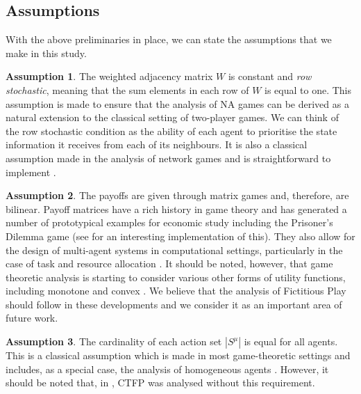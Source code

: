 \documentclass{article}
\theoremstyle{definition}
\newtheorem{assumption}{Assumption}
\newcommand{\weightset}{W}
\newcommand{\actionset}[1]{S^{#1}}
\begin{document}
\subsection{Assumptions}

  With the above preliminaries in place, we can state the assumptions that we make in this study.

  \begin{assumption}\label{ass::rowstochastic}
    The weighted adjacency matrix $\weightset$ is constant and
    \emph{row stochastic}, meaning that the sum elements in each row
    of $\weightset$ is equal to one. This assumption is made to ensure
    that the analysis of NA games can be derived as a natural
    extension to the classical setting of two-player games. We can
    think of the row stochastic condition as the ability of each agent
    to prioritise the state information it receives from each of its
    neighbours. It is also a classical assumption made in the analysis
    of network games \cite{one of the network game papers} and is
    straightforward to implement \cite{Eyad}.
  \end{assumption}

  \begin{assumption}\label{ass::matrixgame}
    The payoffs are given through matrix games and, therefore, are
    bilinear. Payoff matrices have a rich history in game theory and
    has generated a number of prototypical examples for economic study
    including the Prisoner's Dilemma game (see \cite{Axelrod} for an
    interesting implementation of this). They also allow for the
    design of multi-agent systems in computational settings,
    particularly in the case of task and resource allocation \cite{AGT
      and some of the Applied Game Theory Papers}. It should be noted,
    however, that game theoretic analysis is starting to consider
    various other forms of utility functions, including monotone
    \cite{Maryam} and convex \cite{Parise}. We believe that the
    analysis of Fictitious Play should follow in these developments
    and we consider it as an important area of future work.
  \end{assumption}

  \begin{assumption}\label{ass::sameactions}
    The cardinality of each action set $|\actionset{\mu}|$ is equal
    for all agents. This is a classical assumption which is made in
    most game-theoretic settings and includes, as a special case, the
    analysis of homogeneous agents \cite{}. However, it should be
    noted that, in \cite{Ewerhart}, CTFP was analysed without this
    requirement.
  \end{assumption}
\end{document}

